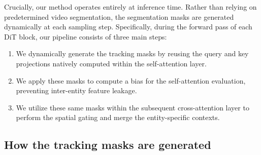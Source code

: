 \documentclass{article}
\begin{document}
Crucially, our method operates entirely at inference time. Rather than relying on predetermined video segmentation, the segmentation masks are generated dynamically at each sampling step. Specifically, during the forward pass of each DiT block, our pipeline consists of three main steps:

\begin{enumerate}
    \item We dynamically generate the tracking masks by reusing the query and key projections natively computed within the self-attention layer.
    \item We apply these masks to compute a bias for the self-attention evaluation, preventing inter-entity feature leakage.
    \item We utilize these same masks within the subsequent cross-attention layer to perform the spatial gating and merge the entity-specific contexts.
\end{enumerate}



\subsection{How the tracking masks are generated}\label{tracking_mask_gen}
\end{document}
